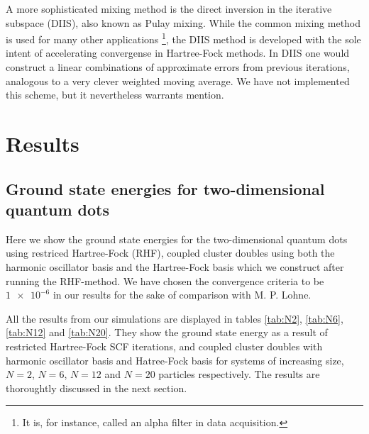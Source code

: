 \documentclass[
    a4paper, aps, twocolumn, floatfix, superscriptaddress,
    nofootinbib]{revtex4-1}
\newcommand{\1}{\mathds{1}}
\begin{document}
        A more sophisticated mixing method is the direct inversion
        in the iterative subspace (DIIS), also known as Pulay mixing. While the
        common mixing method is used for many other applications
        \footnote{It is, for instance, called an alpha filter in data acquisition.},
        the DIIS method is developed with the sole intent of accelerating
        convergense in Hartree-Fock methods. In DIIS one would construct a
        linear combinations of approximate errors from previous iterations,
        analogous to a very clever weighted moving average. We have not implemented
        this scheme, but it nevertheless warrants mention.

\section{Results}

    \subsection{Ground state energies for two-dimensional quantum dots}
        Here we show the ground state energies for the two-dimensional quantum
        dots using restriced Hartree-Fock (RHF), coupled cluster doubles using
        both the harmonic oscillator basis and the Hartree-Fock basis which we
        construct after running the RHF-method. We have chosen the convergence
        criteria to be $\num{1e-6}$ in our results for the sake of comparison
        with M. P. Lohne\cite{lohne2011ab}.

        All the results from our simulations are displayed in tables \ref{tab:N2},
        \ref{tab:N6}, \ref{tab:N12} and \ref{tab:N20}. They show the ground state
        energy as a result of restricted Hartree-Fock SCF iterations, and coupled
        cluster doubles with harmonic oscillator basis and Hatree-Fock basis for
        systems of increasing size, $N=2$, $N=6$, $N=12$ and $N=20$ particles
        respectively. The results are thoroughtly discussed in the next section.
\end{document}
